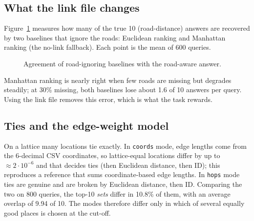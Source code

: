 \documentclass[11pt,a4paper]{article}
\newcommand{\code}[1]{\texttt{#1}}
\begin{document}
\subsection{What the link file changes}
Figure~\ref{fig:base} measures how many of the true 10 (road-distance) answers are recovered by two baselines that ignore the roads:
Euclidean ranking and Manhattan ranking (the no-link fallback). Each point is the mean of 600 queries.
\begin{figure}[h]\centering
{}
\caption{Agreement of road-ignoring baselines with the road-aware answer.}\label{fig:base}
\end{figure}
Manhattan ranking is nearly right when few roads are missing but degrades steadily; at 30\% missing, both baselines lose
about 1.6 of 10 answers per query. Using the link file removes this error, which is what the task rewards.

\subsection{Ties and the edge-weight model}\label{sec:ties}
On a lattice many locations tie exactly. In \code{coords} mode, edge lengths come from the 6-decimal CSV coordinates, so lattice-equal
locations differ by up to $\approx2\cdot10^{-6}$ and that decides ties (then Euclidean distance, then ID); this reproduces a reference
that sums coordinate-based edge lengths. In \code{hops} mode ties are genuine and are broken by Euclidean distance, then ID.
Comparing the two on 800 queries, the top-10 \emph{sets} differ in 10.8\% of them, with an average overlap of 9.94 of 10. The
modes therefore differ only in which of several equally good places is chosen at the cut-off.
\end{document}
